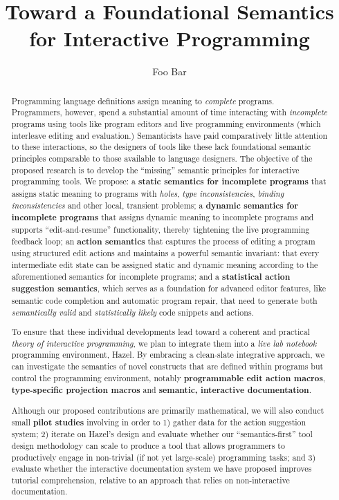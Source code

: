 \documentclass{purple}
\title{Toward a Foundational Semantics 
  \\ 
  for Interactive Programming}
\author{
Foo Bar
}
\newcommand{\Hazel}[0]{\textsf{Hazel}\xspace}
\newcommand{\HazelEnv}[0]{\Hazel\xspace}
\begin{document}
\maketitle

\begin{abstract}
%
Programming language definitions assign meaning to \emph{complete}
programs.
%
Programmers, however, spend a substantial amount of time interacting
with \emph{incomplete} programs using tools like program editors and
live programming environments (which interleave editing and
evaluation.)
%
Semanticists have paid comparatively little attention to these
interactions, so the designers of tools like these lack foundational
semantic principles comparable to those available to language
designers.
%
The objective of the proposed research is to develop the ``missing''
semantic principles for interactive programming tools. We propose:
%
a \textbf{static semantics for incomplete programs} that assigns static meaning to programs with \emph{holes}, \emph{type inconsistencies}, \emph{binding inconsistencies} and other local, transient problems; 
%
a \textbf{dynamic semantics for incomplete programs} that assigns dynamic meaning to incomplete programs and supports ``edit-and-resume'' functionality, thereby tightening the live programming feedback loop;  
%
an \textbf{action semantics} that captures the process of editing a program using structured edit actions and maintains a powerful semantic invariant: that every intermediate edit state can be assigned static and dynamic meaning according to the aforementioned semantics for incomplete programs; and 
%
a \textbf{statistical action suggestion semantics}, which serves as a foundation for advanced editor features, like semantic code completion and automatic program repair, that need to generate both \emph{semantically valid} and \emph{statistically likely} code snippets and actions.

To ensure that these individual developments lead toward a coherent
and practical \emph{theory of interactive programming}, we plan to
integrate them into a \emph{live lab notebook} programming
environment, \HazelEnv. By embracing a clean-slate integrative
approach, we can investigate the semantics of novel constructs that
are defined within programs but control the programming environment,
notably \textbf{programmable edit action macros},
\textbf{type-specific projection macros} and \textbf{semantic,
  interactive documentation}.

Although our proposed contributions are primarily {mathematical}, we
will also conduct small \textbf{pilot studies} involving in order to
1) gather data for the action suggestion system; 2) iterate on
\HazelEnv's design and evaluate whether our ``semantics-first'' tool
design methodology can scale to produce a tool that allows programmers
to productively engage in non-trivial (if not yet large-scale)
programming tasks; and 3) evaluate whether the interactive
documentation system we have proposed improves tutorial comprehension,
relative to an approach that relies on non-interactive documentation.

\end{abstract}
\end{document}

